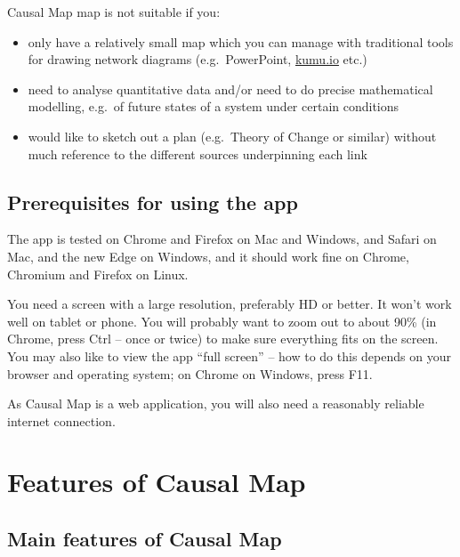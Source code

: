 \documentclass[
]{book}
\providecommand{\tightlist}{%
  \setlength{\itemsep}{0pt}\setlength{\parskip}{0pt}}
\begin{document}
Causal Map map is not suitable if you:

\begin{itemize}
\tightlist
\item
  only have a relatively small map which you can manage with traditional tools for drawing network diagrams (e.g.~PowerPoint, \href{http://kumu.io}{kumu.io} etc.)
\item
  need to analyse quantitative data and/or need to do precise mathematical modelling, e.g.~of future states of a system under certain conditions
\item
  would like to sketch out a plan (e.g.~Theory of Change or similar) without much reference to the different sources underpinning each link
\end{itemize}

\hypertarget{prerequisites-for-using-the-app}{%
\section{Prerequisites for using the app}\label{prerequisites-for-using-the-app}}

The app is tested on Chrome and Firefox on Mac and Windows, and Safari on Mac, and the new Edge on Windows, and it should work fine on Chrome, Chromium and Firefox on Linux.

You need a screen with a large resolution, preferably HD or better. It won't work well on tablet or phone. You will probably want to zoom out to about 90\% (in Chrome, press Ctrl -- once or twice) to make sure everything fits on the screen. You may also like to view the app ``full screen'' -- how to do this depends on your browser and operating system; on Chrome on Windows, press F11.

As Causal Map is a web application, you will also need a reasonably reliable internet connection.

\hypertarget{features-of-causal-map}{%
\chapter{Features of Causal Map}\label{features-of-causal-map}}

\hypertarget{main-features-of-causal-map}{%
\section{Main features of Causal Map}\label{main-features-of-causal-map}}
\end{document}
